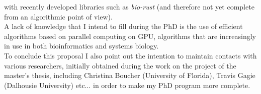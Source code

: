 \documentclass[a4paper,11pt, oneside]{article}
\begin{document}
with recently developed libraries such as \textit{bio-rust} (and therefore not
yet complete from an algorithmic point of view). \\
A lack of knowledge that I intend to fill during the PhD is the use of efficient
algorithms based on parallel computing on GPU, algorithms that are increasingly
in use in both bioinformatics and systems biology. \\
To conclude this proposal I also point out the intention to maintain contacts
with various researchers, initially obtained during the work on the project of
the master’s thesis, including Christina Boucher (University of Florida), Travis
Gagie (Dalhousie University) etc$\ldots$ in order to make my PhD program more
complete. 


\end{document}
